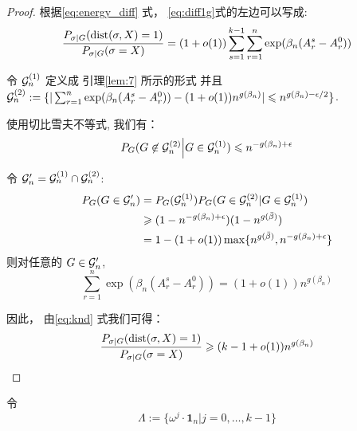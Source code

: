 \begin{proof}
根据\eqref{eq:energy_diff} 式，
\eqref{eq:diff1g}式的左边可以写成:
\begin{equation}\label{eq:knd}
	\frac{P_{\sigma|G}(\operatorname{dist}(\sigma, X)=1)}
{P_{\sigma|G}(\sigma=X)}= (1+o(1))\sum_{s=1}^{k-1}\sum_{r=1}^n \exp(\beta_n (A_r^s - A_r^0))
\end{equation}

令 $\mathcal{G}^{(1)}_n$ 定义成 引理\ref{lem:7} 所示的形式
并且 $\cG^{(2)}_n: = \{|\sum_{r=1}^n \exp(\beta_n (A_r^s - A_r^0)) -\linebreak (1+o(1))n^{g(\beta_n)}  | \leq n^{g(\beta_n) - \epsilon / 2} \}$.

使用切比雪夫不等式, 我们有：
\begin{equation*}
  P_G(G \not\in \mathcal{G}^{(2)}_n \Big\vert  G \in \mathcal{G}^{(1)}_n) \leqslant n^{- g(\beta_n) + \epsilon}
  \end{equation*}
  
  令 $\mathcal{G}'_n = \mathcal{G}^{(1)}_n \cap \mathcal{G}^{(2)}_n$:
  \begin{align*}
  P_G(G \in \mathcal{G}'_n) &= P_G(\mathcal{G}^{(1)}_n) P_G(G \in \mathcal{G}_n^{(2)} | G \in \mathcal{G}_n^{(1)}) \\
  & \geqslant (1-n^{ - g(\beta_n) + \epsilon})(1-n^{g(\bar{\beta})}) \\
  &= 1-(1+o(1))\max\{n^{g(\bar{\beta})}, n^{- g(\beta_n) + \epsilon} \}
  \end{align*}
  则对任意的 $G\in\mathcal{G}'_n$,
  \begin{equation*}
  \sum_{r=1}^n \exp(\beta_n (A_r^s - A_r^0)) = (1+o(1)) n^{g(\beta_n)}
  \end{equation*}
  
  因此，
  由\eqref{eq:knd} 式我们可得：
  \begin{equation*}
    \frac{P_{\sigma|G}(\operatorname{dist}(\sigma, X)=1)}
  {P_{\sigma|G}(\sigma=X)} \geqslant (k-1+o(1)) n^{g(\beta_n)}
  \end{equation*}
\end{proof}


令
\begin{equation}\label{eq:Big_Lambda}
  \Lambda := \{ \omega^j  \cdot \mathbf{1}_n | j=0, \dots,k-1\}   
\end{equation}

